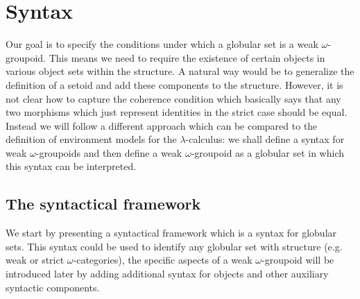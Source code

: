 \section{Syntax}\label{sec:syntax}


Our goal is to specify the conditions under which a globular set is a
weak $\omega$-groupoid. This means we need to require the existence of
certain objects in various object sets within the structure. A natural
way would be to generalize the definition of a setoid and add these
components to the structure. However,  it is not clear how to capture
the coherence condition which basically says that any two morphisms
which just represent identities in the strict case should be
equal. Instead we will follow a different approach which can be
compared to the definition of environment models for the
$\lambda$-calculus: we shall define a syntax for weak
$\omega$-groupoids and then define a weak $\omega$-groupoid as a
globular set in which this syntax can be interpreted.

\subsection{The syntactical framework}
\label{sec:syntactical-framework}

We start by presenting a syntactical framework which is a syntax for
globular sets. This syntax could be used to identify any globular set
with structure (e.g. weak or strict $\omega$-categories), the specific
aspects of a weak $\omega$-groupoid will be introduced later by adding
additional syntax for objects and other auxiliary syntactic
components. 

